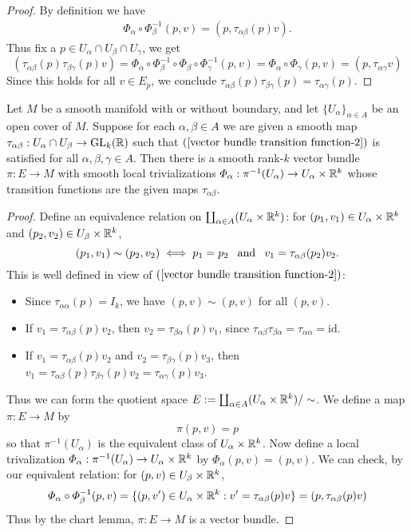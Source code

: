 \begin{proof}
By definition we have
\begin{align*}
\varPhi_\alpha\circ\varPhi_{\beta}^{-1}(p,v)=(p,\tau_{\alpha\beta}(p)v).
\end{align*}
Thus fix a $p\in U_\alpha\cap U_\beta\cap U_\gamma$, we get
\[(\tau_{\alpha\beta}(p)\tau_{\beta\gamma}(p)v)=\varPhi_\alpha\circ\varPhi_{\beta}^{-1}\circ\varPhi_\beta\circ\varPhi_{\gamma}^{-1}(p,v)=\varPhi_{\alpha}\circ\varPhi_{\gamma}(p,v)=(p,\tau_{\alpha\gamma}v)\]
Since this holds for all $v\in E_p$, we conclude $\tau_{\alpha\beta}(p)\tau_{\beta\gamma}(p)=\tau_{\alpha\gamma}(p)$.
\end{proof}
\begin{theorem}\label{vector bundle construct}
Let $M$ be a smooth manifold with or without boundary, and let $\{U_\alpha\}_{\alpha\in A}$ be an open cover of $M$. Suppose for each $\alpha,\beta\in A$ we are 
given a smooth map $\tau_{\alpha\beta}:U_{\alpha}\cap U_{\beta}\to\mathrm{GL}_k(\mathbb{R})$ such that $(\ref{vector bundle transition function-2})$ is satisfied for all $\alpha,\beta,\gamma\in A$. 
Then there is a smooth rank-$k$ vector bundle $\pi:E\to M$ with smooth local trivializations $\varPhi_\alpha:\pi^{-1}(U_\alpha)\to U_\alpha\times\mathbb{R}^k$ whose transition functions are the given maps $\tau_{\alpha\beta}$.
\end{theorem}
\begin{proof}
Define an equivalence relation on $\coprod_{\alpha\in A}(U_\alpha\times\mathbb{R}^k)$: for $(p_1,v_1)\in U_\alpha\times\mathbb{R}^k$ and $(p_2,v_2)\in U_\beta\times\mathbb{R}^k$,
\[(p_1,v_1)\sim(p_2,v_2)\iff p_1=p_2\hspace{8pt}\text{and}\hspace{8pt} v_1=\tau_{\alpha\beta}(p_2)v_2.\]
This is well defined in view of $(\ref{vector bundle transition function-2})$:
\begin{itemize}
\item Since $\tau_{\alpha\alpha}(p)=I_k$, we have $(p,v)\sim(p,v)$ for all $(p,v)$.
\item If $v_1=\tau_{\alpha\beta}(p)v_2$, then $v_2=\tau_{\beta\alpha}(p)v_1$, since $\tau_{\alpha\beta}\tau_{\beta\alpha}=\tau_{\alpha\alpha}=\mathrm{id}$.
\item If $v_1=\tau_{\alpha\beta}(p)v_2$ and $v_2=\tau_{\beta\gamma}(p)v_3$, then $v_1=\tau_{\alpha\beta}(p)\tau_{\beta\gamma}(p)v_2=\tau_{\alpha\gamma}(p)v_3$.
\end{itemize}
Thus we can form the quotient space $E:=\coprod_{\alpha\in A}(U_\alpha\times\mathbb{R}^k)/\sim$. We define a map $\pi:E\to M$ by
\[\pi(p,v)=p\]
so that $\pi^{-1}(U_\alpha)$ is the equivalent class of $U_\alpha\times\mathbb{R}^k$. Now define a local trivalization $\varPhi_\alpha:\pi^{-1}(U_\alpha)\to U_\alpha\times\mathbb{R}^k$ by $\varPhi_\alpha(p,v)=(p,v)$. We can check, by our equivalent relation: for $(p,v)\in U_\beta\times\mathbb{R}^k$,
\[\varPhi_\alpha\circ\varPhi_\beta^{-1}(p,v)=\{(p,v')\in U_\alpha\times\mathbb{R}^k:v'=\tau_{\alpha\beta}(p)v\}=(p,\tau_{\alpha\beta}(p)v)\]
Thus by the chart lemma, $\pi:E\to M$ is a vector bundle.
\end{proof}
